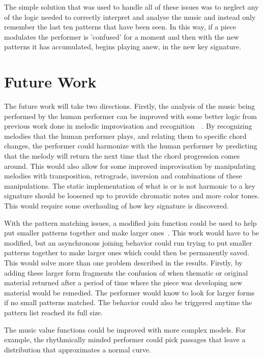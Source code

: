 \documentclass[12pt]{ucthesis}
\begin{document}
{The simple solution that was used to handle all of these issues was to neglect any of the logic needed to correctly interpret and analyse the music and instead only remember the last ten patterns that have been seen. In this way, if a piece modulates the performer is 'confused' for a moment and then with the new patterns it has accumulated, begins playing anew, in the new key signature. 

\chapter{Future Work}
\label{future}

The future work will take two directions. Firstly, the analysis of the music being performed by the human performer can be improved with some better logic from previous work done in melodic improvisation and recognition~\cite{MelodicImprovisation}~\cite{MelodicRecognition}. By recognizing melodies that the human performer plays, and relating them to specific chord changes, the performer could harmonize with the human performer by predicting that the melody will return the next time that the chord progression comes around. This would also allow for some improved improvisation by manipulating melodies with transposition, retrograde, inversion and combinations of these manipulations. The static implementation of what is or is not harmonic to a key signature should be loosened up to provide chromatic notes and more color tones. This would require some overhauling of how key signature is discovered. 

With the pattern matching issues, a modified join function could be used to help put smaller patterns together and make larger ones~\cite{slidingWindow}. This work would have to be modified, but an asynchronous joining behavior could run trying to put smaller patterns together to make larger ones which could then be permanently saved. This would solve more than one problem described in the results. Firstly, by adding these larger form fragments the confusion of when thematic or original material returned after a period of time where the piece was developing new material would be remedied. The performer would know to look for larger forms if no small patterns matched. The behavior could also be triggered anytime the pattern list reached its full size. 

The music value functions could be improved with more complex models. For example, the rhythmically minded performer could pick passages that leave a distribution that approximates a normal curve. 

}
\end{document}

